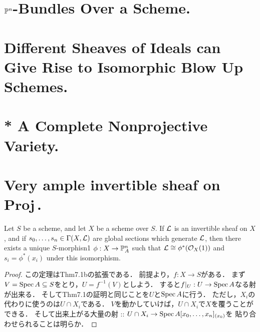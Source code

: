\documentclass[a4paper]{jsarticle}
\newcommand{\gProj}{\mathbf{Proj}\,}
\begin{document}
\section{$\mathbb{P}^n$-Bundles Over a Scheme.} %

\section{Different Sheaves of Ideals can Give Rise to Isomorphic Blow Up Schemes.} %

\section{ } %

\section{* A Complete Nonprojective Variety.} %

\section{Very ample invertible sheaf on $\gProj$.} %
    \begin{Thm}
        Let $S$ be a scheme, and let $X$ be a scheme over $S$.
        If $\mathcal{L}$ is an invertible sheaf on $X$,
        and if $s_0, \dots ,s_n \in \Gamma(X, \mathcal{L})$ are global sections which generate $\mathcal{L}$,
        then there exists a unique $S$-morphisn1 $\phi:X \to \mathbb{P}^n_A$ such that 
        $\mathcal{L} \cong \phi^*(\mathcal{O}_X(1))$ and $s_i = \phi^*(x_i)$ under this isomorphism.
    \end{Thm}
    \begin{proof}
        この定理はThm7.1bの拡張である．
        前提より，$f: X \to S$がある．
        まず$V=\operatorname{Spec} A \subseteq S$をとり，$U=f^{-1}(V)$としよう．
        すると$f|_U: U \to \operatorname{Spec} A$なる射が出来る．
        そしてThm7.1の証明と同じことを$U$と$\operatorname{Spec} A$に行う．
        ただし，$X_i$の代わりに使うのは$U \cap X_i$である．
        $V$を動かしていけば，$U \cap X_i$で$X$を覆うことができる．
        そして出来上がる大量の射 :: $U \cap X_i \to \operatorname{Spec} A[x_0,\dots,x_n]_{(x_0)}$を
        貼り合わせられることは明らか．
    \end{proof}
\end{document}
